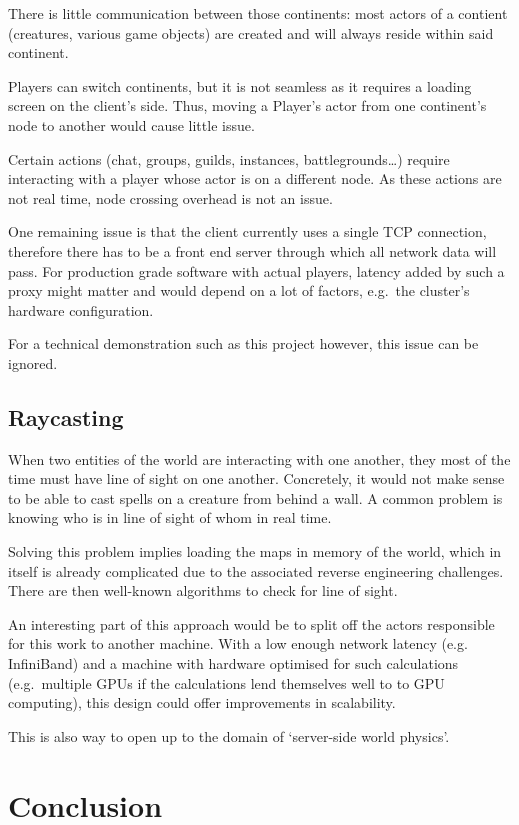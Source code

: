 \documentclass[paper=a4, fontsize=11pt]{scrartcl}
\begin{document}
There is little communication between those continents: most actors of a
contient (creatures, various game objects) are created and will always reside
within said continent.

Players can switch continents, but it is not seamless as it requires a loading
screen on the client's side.
Thus, moving a Player's actor from one continent's node to another would
cause little issue.

Certain actions (chat, groups, guilds, instances, battlegrounds\ldots) 
require interacting with a player whose actor is on a different node.
As these actions are not real time, node crossing overhead is not an issue.

One remaining issue is that the client currently uses a single TCP connection,
therefore there has to be a front end server through which all network data
will pass.
For production grade software with actual players, latency added by such a proxy
might matter and would depend on a lot of factors, e.g.\ the cluster's hardware
configuration.

For a technical demonstration such as this project however, this issue can be
ignored.

\subsection{Raycasting}

When two entities of the world are interacting with one another, they most of
the time must have line of sight on one another.
Concretely, it would not make sense to be able to cast spells on a creature from
behind a wall.
A common problem is knowing who is in line of sight of whom in real time.

Solving this problem implies loading the maps in memory of the world, which in
itself is already complicated due to the associated reverse engineering
challenges.
There are then well-known algorithms to check for line of sight.

An interesting part of this approach would be to split off the actors
responsible for this work to another machine. With a low enough network latency
(e.g. InfiniBand) and a machine with hardware optimised for such
calculations (e.g.\ multiple GPUs if the calculations lend themselves well to
to GPU computing), this design could offer improvements in scalability.

This is also way to open up to the domain of `server-side world physics'.

\section{Conclusion}
\end{document}
